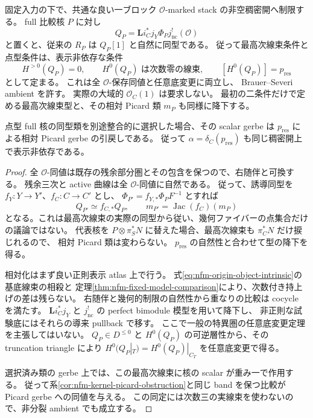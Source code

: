 \begin{corollary}
\label{cor:nfm-point-type-O-descent}
固定入力の下で、共通な良い一ブロック $\mathcal O$-marked stack の非空稠密開へ制限する。
full 比較核 $P$ に対し
\begin{equation}\label{eq:nfm-point-type-intrinsic-complex}
 Q_P=\mathbf Li_C^*j_Y\Phi_Pj_{\mathrm{nc}}^!(\mathcal O)
\end{equation}
と置くと、従来の $R_P$ は $Q_P[1]$ と自然に同型である。
従って最高次線束条件と点型条件は、表示非依存な条件
\[
 H^{>0}(Q_P)=0,\qquad
 H^0(Q_P)\text{ は次数零の線束},\qquad
 [H^0(Q_P)]=p_{\mathrm{res}}
\]
として定まる。
これは全 $\mathcal O$-保存同値と任意底変更に両立し、
Brauer--Severi ambient を許す。
実際の大域的 $\mathcal O_C(1)$ は要求しない。
最初の二条件だけで定める最高次線束型と、その相対 Picard 類 $m_P$ も同様に降下する。

点型 full 核の同型類を別途整合的に選択した場合、その scalar gerbe は
$p_{\mathrm{res}}$ による相対 Picard gerbe の引戻しである。
従って $\alpha=\delta_C(p_{\mathrm{res}})$ も同じ稠密開上で表示非依存である。
\end{corollary}

\begin{proof}
全 $\mathcal O$-同値は既存の残余部分圏とその包含を保つので、右随伴と可換する。
残余三次と active 曲線は全 $\mathcal O$-同値に自然である。
従って、誘導同型を $f_Y:Y\to Y'$、$f_C:C\to C'$ とし、
$\Phi_{P'}=f_{Y,*}\Phi_PF^{-1}$ とすれば
\[
 Q_{P'}\simeq f_{C,*}Q_P,
 \qquad m_{P'}=\operatorname{Jac}(f_C)(m_P)
\]
となる。これは最高次線束の実際の同型から従い、幾何ファイバーの点集合だけの議論ではない。
代表核を $P\otimes\pi_S^*N$ に替えた場合、最高次線束も $\pi_C^*N$ だけ捩じれるので、
相対 Picard 類は変わらない。
$p_{\mathrm{res}}$ の自然性と合わせて型の降下を得る。

相対化はまず良い正則表示 atlas 上で行う。
式\eqref{eq:nfm-origin-object-intrinsic}の基底線束の相殺と
定理\ref{thm:nfm-fixed-model-comparison}により、次数付き持上げの差は残らない。
右随伴と幾何的制限の自然性から重なりの比較は cocycle を満たす。
$\mathbf Li_C^*j_Y$ と $j_{\mathrm{nc}}^!$ の perfect bimodule 模型を用いて降下し、
非正則な試験底にはそれらの導来 pullback で移す。
ここで一般の特異圏の任意底変更定理を主張してはいない。
$Q_P\in D^{\le0}$ と $H^0(Q_P)$ の可逆層性から、その truncation triangle により
$H^0(Q_P|_T)=H^0(Q_P)|_{C_T}$ を任意底変更で得る。

選択済み類の gerbe 上では、この最高次線束に核の scalar が重み一で作用する。
従って系\ref{cor:nfm-kernel-picard-obstruction}と同じ band を保つ比較が
Picard gerbe への同値を与える。
この同定には次数三の実線束を使わないので、非分裂 ambient でも成立する。
\end{proof}

